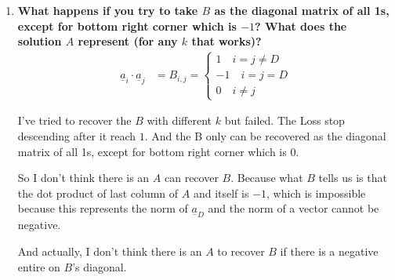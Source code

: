 \documentclass[11pt,letterpaper]{article}
\begin{document}
\begin{enumerate}
\begin{enumerate}
    \item 
    \textbf{
     What happens if you try to take $B$ as the diagonal matrix of all 1s, except for bottom right corner which is $-1$? What does the solution $A$ represent (for any $k$ that works)?
    }
    \begin{align*}
        \underline a_i \cdot \underline a_j &= B_{i,j} = 
        \begin{cases}
             1 \quad i=j\not=D \\
             -1 \quad i=j=D \\
             0 \quad i\not=j  
        \end{cases}
    \end{align*}
    
    \begin{flushleft}
        \justifying
         I've tried to recover the $B$ with different $k$ but failed. The Loss stop descending after it reach $1$. And the B only can be recovered as the diagonal matrix of all 1s, except for bottom right corner which is $0$. 
    \end{flushleft}
    
    \begin{flushleft}
        \justifying
         So I don't think there is an $A$ can recover $B$. Because what $B$ tells us is that the dot product of last column of $A$ and itself is $-1$, which is impossible because this represents the norm of $\underline a_D$ and the norm of a vector cannot be negative.
    \end{flushleft}

    \begin{flushleft}
        \justifying
         And actually, I don't think there is an $A$ to recover $B$ if there is a negative entire on $B$'s diagonal.
    \end{flushleft}
    \newpage
    
\end{enumerate}
\bigskip


\end{enumerate}
\end{document}

